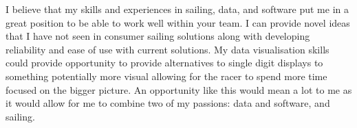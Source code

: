 \documentclass[11pt, a4paper]{awesome-cv}
\begin{document}
\begin{cvletter}
I believe that my skills and experiences in sailing, data, and software put me in a great position to be able to work well within your team. I can provide novel ideas that I have not seen in consumer sailing solutions along with developing reliability and ease of use with current solutions. My data visualisation skills could provide opportunity to provide alternatives to single digit displays to something potentially more visual allowing for the racer to spend more time focused on the bigger picture. An opportunity like this would mean a lot to me as it would allow for me to combine two of my passions: data and software, and sailing.


\end{cvletter}

\makeletterclosing
\end{document}
